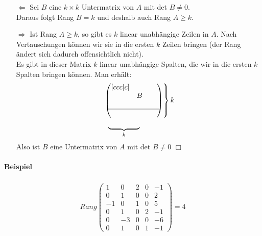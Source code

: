 \documentclass[11pt]{report}
\begin{document}
\begin{itemize}
 \item[$\Leftarrow$] Sei $B$ eine $k \times k$ Untermatrix von $A$ mit det $B \neq 0$. \\
Daraus folgt Rang $B = k$ und deshalb auch Rang $A \geq k$.
 \item[$\Rightarrow$] Ist Rang $A \geq k$, so gibt es $k$ linear unabhängige Zeilen in $A$. Nach Vertauschungen können wir sie in die ersten $k$ Zeilen bringen (der Rang ändert sich dadurch offensichtlich nicht). \\
Es gibt in dieser Matrix $k$ linear unabhängige Spalten, die wir in die ersten $k$ Spalten bringen können. Man erhält:
\begin{align}
&\left.\begin{pmatrix}[ccc|c] & & & \\ & B & & \\ & & & \\ \hline & & & \end{pmatrix} \right\} \begin{matrix} \\ k \\ \\ \end{matrix} \\
&\phantom{n}\underbrace{\phantom{mmmmm}}_{k}
\end{align}
Also ist $B$ eine Untermatrix von $A$ mit det $B \neq 0$ \hfill $\Box$
\end{itemize}

\paragraph{Beispiel}
\begin{align}
Rang \begin{pmatrix} 1 & 0 & 2 & 0 & -1 \\ 0 & 1 & 0 & 0 & 2 \\ -1 & 0 & 1 & 0 & 5 \\ 0 & 1 & 0 & 2 & -1 \\ 0 & -3 & 0 & 0 & -6 \\ 0 & 1 & 0 & 1 & -1 \end{pmatrix} = 4
\end{align}
\end{document}

